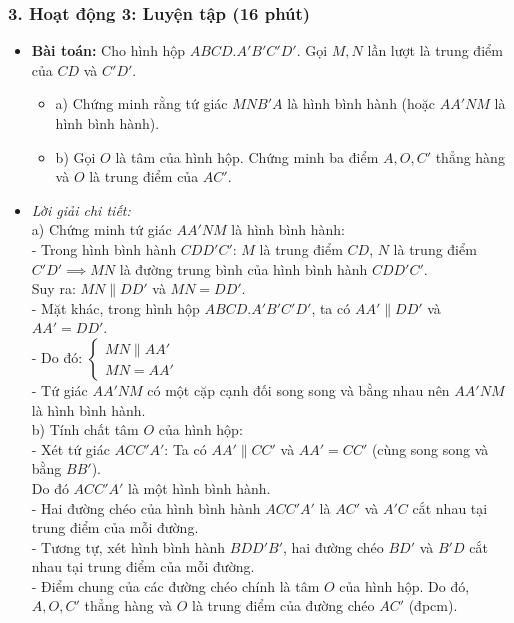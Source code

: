 \documentclass[12pt, a4paper]{article}
\begin{document}
\subsubsection*{3. Hoạt động 3: Luyện tập (16 phút)}
\begin{itemize}
    \item \textbf{Bài toán:} Cho hình hộp $ABCD.A'B'C'D'$. Gọi $M, N$ lần lượt là trung điểm của $CD$ và $C'D'$.
    \begin{itemize}
        \item a) Chứng minh rằng tứ giác $MNB'A$ là hình bình hành (hoặc $AA'NM$ là hình bình hành).
        \item b) Gọi $O$ là tâm của hình hộp. Chứng minh ba điểm $A, O, C'$ thẳng hàng và $O$ là trung điểm của $AC'$.
    \end{itemize}
    \item \textit{Lời giải chi tiết:}\\
    a) Chứng minh tứ giác $AA'NM$ là hình bình hành:\\
    - Trong hình bình hành $CDD'C'$: $M$ là trung điểm $CD$, $N$ là trung điểm $C'D' \implies MN$ là đường trung bình của hình bình hành $CDD'C'$.\\
    Suy ra: $MN \parallel DD'$ và $MN = DD'$.\\
    - Mặt khác, trong hình hộp $ABCD.A'B'C'D'$, ta có $AA' \parallel DD'$ và $AA' = DD'$.\\
    - Do đó: $\begin{cases} MN \parallel AA' \\ MN = AA' \end{cases}$\\
    - Tứ giác $AA'NM$ có một cặp cạnh đối song song và bằng nhau nên $AA'NM$ là hình bình hành.\\
    b) Tính chất tâm $O$ của hình hộp:\\
    - Xét tứ giác $ACC'A'$: Ta có $AA' \parallel CC'$ và $AA' = CC'$ (cùng song song và bằng $BB'$).\\
    Do đó $ACC'A'$ là một hình bình hành.\\
    - Hai đường chéo của hình bình hành $ACC'A'$ là $AC'$ và $A'C$ cắt nhau tại trung điểm của mỗi đường.\\
    - Tương tự, xét hình bình hành $BDD'B'$, hai đường chéo $BD'$ và $B'D$ cắt nhau tại trung điểm của mỗi đường.\\
    - Điểm chung của các đường chéo chính là tâm $O$ của hình hộp. Do đó, $A, O, C'$ thẳng hàng và $O$ là trung điểm của đường chéo $AC'$ (đpcm).
\end{itemize}
\end{document}
